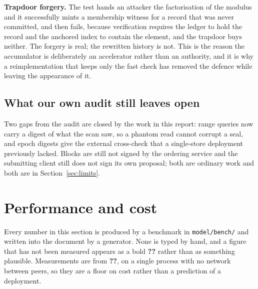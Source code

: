 \documentclass[11pt,a4paper]{article}
\providecommand{\num}[1]{\textbf{??}}%
\begin{document}
\textbf{Trapdoor forgery.} The test hands an attacker the factorisation of the
modulus and it successfully mints a membership witness for a record that was
never committed, and then fails, because verification requires the ledger to
hold the record and the anchored index to contain the element, and the trapdoor
buys neither. The forgery is real; the rewritten history is not. This is the
reason the accumulator is deliberately an accelerator rather than an authority,
and it is why a reimplementation that keeps only the fast check has removed the
defence while leaving the appearance of it.

\subsection{What our own audit still leaves open}

Two gaps from the audit are closed by the work in this report: range queries now
carry a digest of what the scan saw, so a phantom read cannot corrupt a seal, and
epoch digests give the external cross-check that a single-store deployment
previously lacked. Blocks are still not signed by the ordering service and the
submitting client still does not sign its own proposal; both are ordinary work
and both are in Section~\ref{sec:limits}.

\section{Performance and cost}
\label{sec:performance}

Every number in this section is produced by a benchmark in \texttt{model/bench/}
and written into the document by a generator. None is typed by hand, and a figure
that has not been measured appears as a bold \textbf{??} rather than as something
plausible. Measurements are from \num{LedgerMachine}, on a single process with no
network between peers, so they are a floor on cost rather than a prediction of a
deployment.
\end{document}
